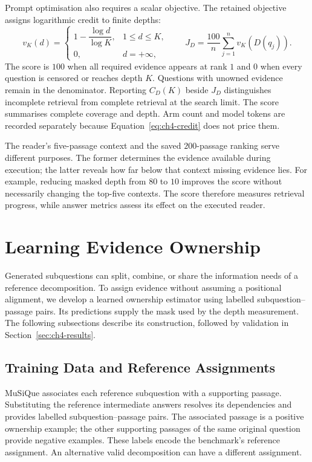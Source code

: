 Prompt optimisation also requires a scalar objective. The retained objective
assigns logarithmic credit to finite depths:
\begin{equation}
  v_K(d)=
  \begin{cases}
    1-\dfrac{\log d}{\log K}, & 1\leq d\leq K,\\[2mm]
    0, & d=+\infty,
  \end{cases}
  \qquad
  J_D=\frac{100}{n}\sum_{j=1}^{n}v_K(D(q_j)).
  \label{eq:ch4-credit}
\end{equation}
The score is $100$ when all required evidence appears at rank $1$ and $0$
when every question is censored or reaches depth $K$. Questions with unowned
evidence remain in the denominator. Reporting $C_D(K)$ beside $J_D$
distinguishes incomplete retrieval from complete retrieval at the search limit.
The score summarises complete coverage and depth. Arm count and model tokens
are recorded separately because Equation~\ref{eq:ch4-credit} does not price
them.

The reader's five-passage context and the saved $200$-passage ranking serve
different purposes. The former determines the evidence available during
execution; the latter reveals how far below that context missing evidence
lies. For example, reducing masked depth from $80$ to $10$ improves the
score without necessarily changing the top-five contexts. The score
therefore measures retrieval progress, while answer metrics assess its
effect on the executed reader.

\section{Learning Evidence Ownership}
\label{sec:ch4-ownership}

Generated subquestions can split, combine, or share the information needs of
a reference decomposition. To assign evidence without assuming a positional
alignment, we develop a learned ownership estimator using labelled
subquestion--passage pairs. Its predictions supply the mask used by the depth
measurement. The following subsections describe its construction, followed
by validation in Section~\ref{sec:ch4-results}.

\subsection{Training Data and Reference Assignments}

MuSiQue associates each reference subquestion with a supporting passage.
Substituting the reference intermediate answers resolves its dependencies and
provides labelled subquestion--passage pairs. The associated passage is a
positive ownership example; the other supporting passages of the same original
question provide negative examples. These labels encode the benchmark's
reference assignment. An alternative valid decomposition can have a different
assignment.

